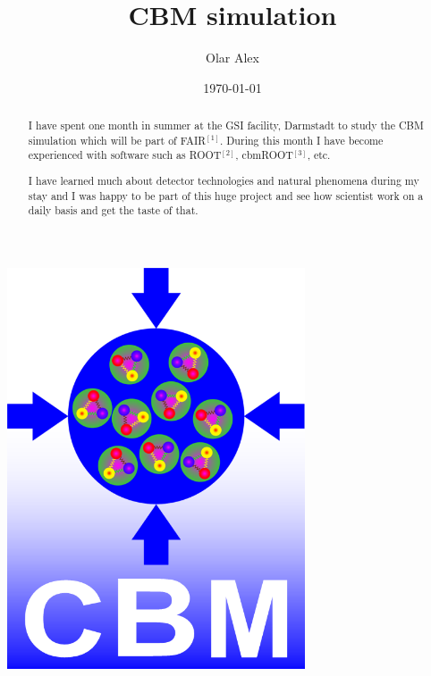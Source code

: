 \documentclass[a4paper,12pt]{article}
\author{Olar Alex}
\title{CBM simulation}
\date{\today}
\begin{document}
\maketitle
\vfill
\begin{center}
\includegraphics[width=0.66\textwidth]{gsi.png}
\end{center}
\newpage
\renewcommand{\abstractname}{Introduction}
\renewcommand{\thesection}{\Roman{section}.}
\renewcommand{\thesubsection}{\thesection.\arabic{subsection}.}
\renewcommand{\thesubsubsection}{\thesubsection.\arabic{subsubsection}.}
\begin{abstract}
	\par I have spent one month in summer at the GSI facility, Darmstadt to study the CBM simulation which will be part of FAIR$^{[1]}$. During this month I have become experienced with software such as ROOT$^{[2]}$, cbmROOT$^{[3]}$, etc.
	\vspace{5mm}
	\par I have learned much about detector technologies and natural phenomena during my stay and I was happy to be part of this huge project and see how scientist work on a daily basis and get the taste of that.
\end{abstract}
\tableofcontents
\newpage
\end{document}
